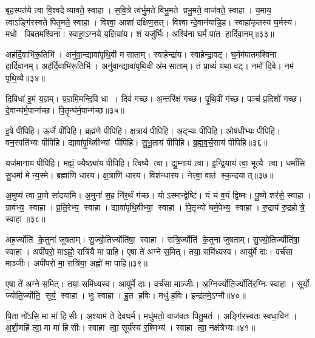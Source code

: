 बृह॒स्पत॑ये त्वा वि॒श्वदेव्यावते॒ स्वाहा। स॒वि॒त्रे त्व॑र्भु॒मते॑ विभु॒मते प्रभु॒मते॒ वाज॑वते॒ स्वाहा। य॒माय॒ त्वाऽङ्गि॑रस्वते पितृ॒मते॒ स्वाहा। विश्वा॒ आशा॑ दक्षिण॒सत्। विश्वान्दे॒वान॑याडि॒ह। स्वाहा॑कृतस्य घ॒र्मस्य॑। मधो पिबतमश्विना। स्वाहा॒ऽग्नये॑ य॒ज्ञिया॑य। शं यजु॑र्भिः। अश्वि॑ना घ॒र्मं पा॑त हार्दिवा॒नम्॥३३॥

अह॑र्दि॒वाभि॑रू॒तिभि॑। अनु॑वा॒न्द्यावा॑पृथि॒वी मसाताम्। स्वाहेन्द्रा॑य। स्वाहेन्द्रा॒वट्। घ॒र्मम॑पातमश्विना हार्दिवा॒नम्। अह॑र्दि॒वाभि॑रू॒तिभि॑। अनु॑वा॒न्द्यावा॑पृथि॒वी अ॑मसाताम्। तं प्रा॒व्यं॑ यथा॒ वट्। नमो॑ दि॒वे। नम॑ पृथि॒व्यै॥३४॥

दि॒विधा॑ इ॒मं य॒ज्ञम्। य॒ज्ञमि॒मन्दि॒वि धा। दिवं॑ गच्छ। अ॒न्तरि॑क्षं गच्छ। पृ॒थि॒वीं ग॑च्छ। पञ्च॑ प्र॒दिशो॑ गच्छ। दे॒वान्घ॑र्म॒पान्ग॑च्छ। पि॒तॄन्घ॑र्म॒पान्ग॑च्छ॥३५॥
\anuvakamend[आ॒दि॒त्यव॑ते॒ स्वाहा॑ हार्दिवा॒नं पृ॑थि॒व्या अ॒ष्टौ च॑]

इ॒षे पी॑पिहि। ऊ॒र्जे पी॑पिहि। ब्रह्म॑णे पीपिहि। क्ष॒त्राय॑ पीपिहि। अ॒द्भ्यः पी॑पिहि। ओष॑धीभ्यः पीपिहि। वन॒स्पति॑भ्यः पीपिहि। द्यावा॑पृ॒थिवीभ्यां पीपिहि। सु॒भू॒ताय॑ पीपिहि। ब्र॒ह्म॒व॒र्च॒साय॑ पीपिहि॥३६॥

यज॑मानाय पीपिहि। मह्यं॒ ज्यैष्ठ्या॑य पीपिहि। त्विष्यै त्वा। द्यु॒म्नाय॑ त्वा। इ॒न्द्रि॒याय॑ त्वा॒ भूत्यै त्वा। धर्मा॑सि सु॒धर्मा मेन्य॒स्मे। ब्रह्मा॑णि धारय। क्ष॒त्राणि॑ धारय। विश॑न्धारय। नेत्त्वा॒ वात॑ स्क॒न्दयात्॥३७॥

अ॒मुष्य॑ त्वा प्रा॒णे सा॑दयामि। अ॒मुना॑ स॒ह नि॑र॒र्थं ग॑च्छ। योऽस्मान्द्वेष्टि॑। यं च॑ व॒यं द्वि॒ष्मः। पू॒ष्णे शर॑से॒ स्वाहा। ग्राव॑भ्य॒ स्वाहा। प्र॒ति॒रेभ्य॒ स्वाहा। द्यावा॑पृथि॒वीभ्या॒ स्वाहा। पि॒तृभ्यो॑ घर्म॒पेभ्य॒ स्वाहा। रु॒द्राय॑ रु॒द्रहोत्रे॒ स्वाहा॥३८॥

अह॒र्ज्योति॑ के॒तुना॑ जुषताम्। सु॒ज्यो॒तिर्ज्योति॑षा॒ स्वाहा। रात्रि॒र्ज्योति॑ के॒तुना॑ जुषताम्। सु॒ज्यो॒तिर्ज्योति॑षा॒ स्वाहा। अपी॑परो॒ माऽह्नो॒ रात्रि॑यै मा पाहि। ए॒षा ते॑ अग्ने स॒मित्। तया॒ समि॑ध्यस्व। आयु॑र्मे दाः। वर्च॑सा माञ्जीः। अपी॑परो मा॒ रात्रि॑या॒ अह्नो॑ मा पाहि॥३९॥

ए॒षा ते॑ अग्ने स॒मित्। तया॒ समि॑ध्यस्व। आयु॑र्मे दाः। वर्च॑सा माञ्जीः। अ॒ग्निर्ज्योति॒र्ज्योति॑र॒ग्निः स्वाहा। सूर्यो॒ ज्योति॒र्ज्योति॒ सूर्य॒ स्वाहा। भूः स्वाहा। हु॒त ह॒विः। मधु॑ ह॒विः। इन्द्र॑तमे॒ऽग्नौ॥४०॥

पि॒ता नो॑ऽसि॒ मा मा॑ हिसीः। अ॒श्याम॑ ते देवघर्म। मधु॑मतो॒ वाज॑वतः पितु॒मत॑। अङ्गि॑रस्वतः स्वधा॒विन॑। अ॒शी॒महि॑ त्वा॒ मा मा॑ हिसीः। स्वाहा त्वा॒ सूर्य॑स्य र॒श्मिभ्य॑। स्वाहा त्वा॒ नक्ष॑त्रेभ्यः॥४१॥
\anuvakamend[ब्र॒ह्म॒व॒र्च॒साय॑ पीपिहि स्क॒न्दयाद्रु॒द्राय॑ रु॒द्रहोत्रे॒ स्वाहाऽह्नो॑ मा पाह्य॒ग्नौ स॒प्त च॑]

